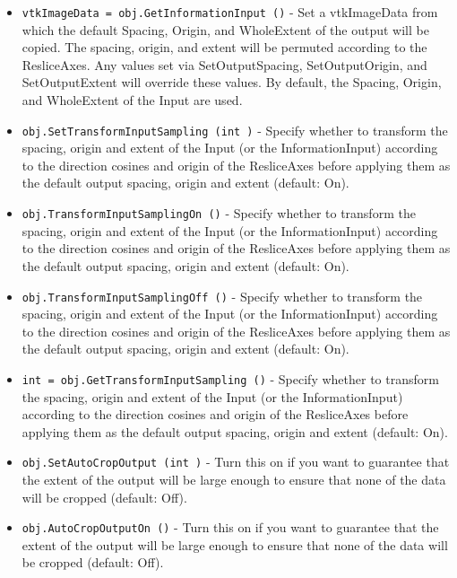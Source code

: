 \begin{itemize}
\item  \verb|vtkImageData = obj.GetInformationInput ()| -  Set a vtkImageData from which the default Spacing, Origin,
 and WholeExtent of the output will be copied.  The spacing,
 origin, and extent will be permuted according to the 
 ResliceAxes.  Any values set via SetOutputSpacing, 
 SetOutputOrigin, and SetOutputExtent will override these
 values.  By default, the Spacing, Origin, and WholeExtent
 of the Input are used.

\item  \verb|obj.SetTransformInputSampling (int )| -  Specify whether to transform the spacing, origin and extent
 of the Input (or the InformationInput) according to the
 direction cosines and origin of the ResliceAxes before applying
 them as the default output spacing, origin and extent 
 (default: On).

\item  \verb|obj.TransformInputSamplingOn ()| -  Specify whether to transform the spacing, origin and extent
 of the Input (or the InformationInput) according to the
 direction cosines and origin of the ResliceAxes before applying
 them as the default output spacing, origin and extent 
 (default: On).

\item  \verb|obj.TransformInputSamplingOff ()| -  Specify whether to transform the spacing, origin and extent
 of the Input (or the InformationInput) according to the
 direction cosines and origin of the ResliceAxes before applying
 them as the default output spacing, origin and extent 
 (default: On).

\item  \verb|int = obj.GetTransformInputSampling ()| -  Specify whether to transform the spacing, origin and extent
 of the Input (or the InformationInput) according to the
 direction cosines and origin of the ResliceAxes before applying
 them as the default output spacing, origin and extent 
 (default: On).

\item  \verb|obj.SetAutoCropOutput (int )| -  Turn this on if you want to guarantee that the extent of the
 output will be large enough to ensure that none of the 
 data will be cropped (default: Off).

\item  \verb|obj.AutoCropOutputOn ()| -  Turn this on if you want to guarantee that the extent of the
 output will be large enough to ensure that none of the 
 data will be cropped (default: Off).


\end{itemize}
